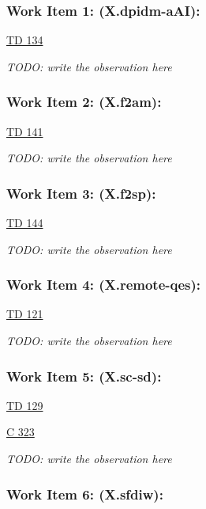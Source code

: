 \subsubsection{Work Item 1: (X.dpidm-aAI):}

\href{https://www.itu.int/md/meetingdoc.asp?lang=en\&parent=T25-SG17-251203-TD-WP1-0134}{TD 134}

\textit{TODO: write the observation here}

\subsubsection{Work Item 2: (X.f2am):}

\href{https://www.itu.int/md/meetingdoc.asp?lang=en\&parent=T25-SG17-251203-TD-WP1-0141}{TD 141}

\textit{TODO: write the observation here}

\subsubsection{Work Item 3: (X.f2sp):}

\href{https://www.itu.int/md/meetingdoc.asp?lang=en\&parent=T25-SG17-251203-TD-WP1-0144}{TD 144}

\textit{TODO: write the observation here}

\subsubsection{Work Item 4: (X.remote-qes):}

\href{https://www.itu.int/md/meetingdoc.asp?lang=en\&parent=T25-SG17-251203-TD-WP1-0121}{TD 121}

\textit{TODO: write the observation here}

\subsubsection{Work Item 5: (X.sc-sd):}

\href{https://www.itu.int/md/meetingdoc.asp?lang=en\&parent=T25-SG17-251203-TD-WP1-0129}{TD 129}

\href{https://www.itu.int/md/meetingdoc.asp?lang=en\&parent=T25-SG17-C-0323}{C 323 }

\textit{TODO: write the observation here}

\subsubsection{Work Item 6: (X.sfdiw):}

